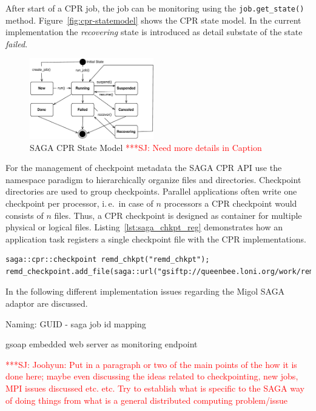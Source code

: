 \documentclass[times, 10pt,twocolumn]{article}
\newcommand{\jhanote}[1]{ {\textcolor{red} { ***SJ: #1 }}}
\begin{document}
After start of a CPR job, the job can be monitoring using the \texttt{job.get\_state()} method. Figure~\ref{fig:cpr-statemodel} shows the CPR state model. In the current implementation the \emph{recovering} state is introduced as detail substate of the state \emph{failed}.
\begin{figure}[th]
    \centering
        \includegraphics[width=0.48\textwidth]{cpr-statemodel.pdf}
    \caption{SAGA CPR State Model \jhanote{Need more details in Caption} }
    \label{fig:cpr-statemodel }
\end{figure}
                               

For the management of checkpoint metadata the SAGA CPR API use the namespace paradigm to hierarchically 
organize files and directories. Checkpoint directories are 
used to group checkpoints. Parallel applications often write one checkpoint per 
processor, i.\,e.\ in case of $n$ processors a CPR checkpoint
would consists of $n$ files. Thus, a CPR checkpoint is designed as container 
for multiple physical or logical files. Listing~\ref{lst:saga_chkpt_reg} demonstrates how an application task registers a single checkpoint file with the CPR implementations.     
\begin{lstlisting}[style=myListing, caption={SAGA CPR: Register Checkpoint with Migol}, label={lst:saga_chkpt_reg}]
saga::cpr::checkpoint remd_chkpt("remd_chkpt");
remd_checkpoint.add_file(saga::url("gsiftp://queenbee.loni.org/work/remd/remd_chkpt.dat"));
\end{lstlisting}

In the following different implementation issues regarding the Migol SAGA adaptor are discussed.

\label{sec:saga_cpr_migol_adaptor}
                  
Naming: GUID - saga job id mapping

gsoap embedded web server as monitoring endpoint



\jhanote{Joohyun: Put in a paragraph or two of the main points of the
  how it is done here; maybe even discussing the ideas related to
  checkpointing, new jobs, MPI issues discussed etc. etc. Try to
  establish what is specific to the SAGA way of doing things from what
  is a general distributed computing problem/issue}
\end{document}
